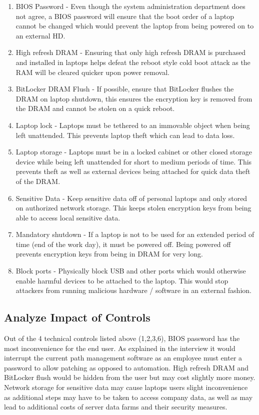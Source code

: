 \documentclass[paper=a4, fontsize=11pt]{scrartcl} %
\numberwithin{equation}{section} %
\numberwithin{figure}{section} %
\numberwithin{table}{section} %
\begin{document}
\begin{enumerate}
\item BIOS Password - Even though the system administration department does not 
agree, a BIOS password will ensure that the boot order of a laptop cannot be
changed which would prevent the laptop from being powered on to an external HD.
\item High refresh DRAM - Ensuring that only high refresh DRAM is purchased and
installed in laptops helps defeat the reboot style cold boot attack as the RAM
will be cleared quicker upon power removal.
\item BitLocker DRAM Flush - If possible, ensure that BitLocker flushes the DRAM
on laptop shutdown, this ensures the encryption key is removed from the DRAM and
cannot be stolen on a quick reboot.
\item Laptop lock - Laptops must be tethered to an immovable object when being 
left unattended. This prevents laptop theft which can lead to data loss.
\item Laptop storage - Laptops must be in a locked cabinet or other closed storage
device while being left unattended for short to medium periods of time. This 
prevents theft as well as external devices being attached for quick data
theft of the DRAM.
\item Sensitive Data - Keep sensitive data off of personal laptops and only
stored on authorized network storage. This keeps stolen encryption keys from
being able to access local sensitive data.
\item Mandatory shutdown - If a laptop is not to be used for an extended period
of time (end of the work day), it must be powered off. Being powered off prevents
encryption keys from being in DRAM for very long.
\item Block ports - Physically block USB and other ports which would otherwise
enable harmful devices to be attached to the laptop. This would stop attackers
from running malicious hardware / software in an external fashion.
\end{enumerate}


\subsection{Analyze Impact of Controls}

Out of the 4 technical controls listed above (1,2,3,6), BIOS password has the
most inconvenience for the end user. As explained in the interview it would
interrupt the current path management software as an employee must enter a
password to allow patching as opposed to automation. High refresh DRAM and
BitLocker flush would be hidden from the user but may cost slightly more money.
Network storage for sensitive data may cause laptops users slight inconvenience
as additional steps may have to be taken to access company data, as well as
may lead to additional costs of server data farms and their security measures.\\
\end{document}
